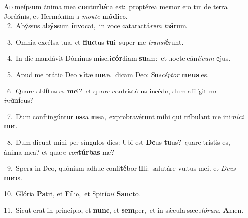 \lettrine{\initial\textcolor{\initialcolor}{A}}{d} meípsum ánima mea \textbf{con}\-tur\-\textbf{bá}\-ta est:~\star proptérea memor ero tui de terra Jordánis, et Hermóniim a \textit{mon}\-\textit{te} \textbf{mó}\-\textbf{di}co.\\
{\numbfont\textcolor{\numbcolor}{~2.}}~Abýssus a\-\textbf{býs}\-sum \textbf{ín}\-vocat,~\star in voce cataractá\textit{rum} \textit{tu}\-\textbf{á}rum.\par
{\numbfont\textcolor{\numbcolor}{~3.}}~Omnia excélsa tua, et \textbf{fluc}\-tus \textbf{tu}\-i~\star super me \textit{trans}\-\textit{i}\textbf{é}runt.\par
{\numbfont\textcolor{\numbcolor}{~4.}}~In die mandávit Dóminus miseri\-\textbf{cór}\-diam \textbf{su}\-am:~\star et nocte cán\-\textit{ti}\-\textit{cum} \textbf{e}\-jus.\par
{\numbfont\textcolor{\numbcolor}{~5.}}~Apud me orátio Deo \textbf{vi}\-tæ \textbf{me}\-æ,~\star dicam Deo: Su\-\textit{scép}\-\textit{tor} \textbf{me}\-\textbf{us} es.\par
{\numbfont\textcolor{\numbcolor}{~6.}}~Quare ob\-\textbf{lí}\-tus es \textbf{me}\-i?~\star et quare contristátus incédo, dum afflígit me \textit{in}\-\textit{i}\textbf{mí}cus?\par
{\numbfont\textcolor{\numbcolor}{~7.}}~Dum confringúntur \textbf{os}\-sa \textbf{me}\-a,~\star exprobravérunt mihi qui tríbulant me ini\-\textit{mí}\-\textit{ci} \textbf{me}\-i.\par
{\numbfont\textcolor{\numbcolor}{~8.}}~Dum dicunt mihi per síngulos dies: Ubi est \textbf{De}\-us \textbf{tu}\-us?~\star quare tristis es, ánima mea? et qua\textit{re} \textit{con}\-\textbf{túr}\textbf{bas} me?\par
{\numbfont\textcolor{\numbcolor}{~9.}}~Spera in Deo, quóniam adhuc confi\-\textbf{té}\-bor \textbf{il}\-li:~\star salutáre vultus mei, et \textit{De}\-\textit{us} \textbf{me}\-us.\par
{\numbfont\textcolor{\numbcolor}{10.}}~Glória \textbf{Pa}\-tri, et \textbf{Fí}\-lio,~\star et Spirí\-\textit{tu}\-\textit{i} \textbf{Sanc}\-to.\par
{\numbfont\textcolor{\numbcolor}{11.}}~Sicut erat in princípio, et \textbf{nunc}\-, et \textbf{sem}\-per,~\star et in sǽcula sæcu\-\textit{ló}\-\textit{rum}. \textbf{A}\-men.\par
